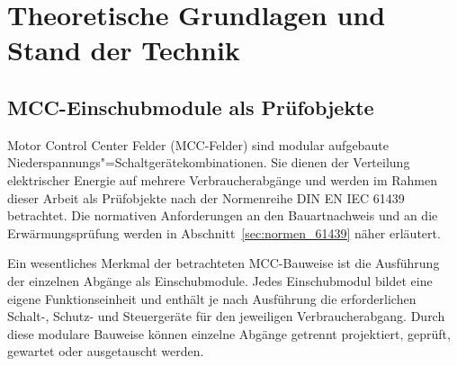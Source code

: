 \section{Theoretische Grundlagen und Stand der Technik}
\label{chap:theorieteil}



\subsection{MCC-Einschubmodule als Prüfobjekte}
\label{sec:mcc_einschubmodule}

Motor Control Center Felder (MCC-Felder) sind modular aufgebaute Niederspannungs"=Schaltgerätekombinationen. Sie dienen der Verteilung elektrischer Energie auf mehrere Verbraucherabgänge und werden im Rahmen dieser Arbeit als Prüfobjekte nach der Normenreihe DIN EN IEC 61439 betrachtet. Die normativen Anforderungen an den Bauartnachweis und an die Erwärmungsprüfung werden in Abschnitt~\ref{sec:normen_61439} näher erläutert.

Ein wesentliches Merkmal der betrachteten MCC-Bauweise ist die Ausführung der einzelnen Abgänge als Einschubmodule. Jedes Einschubmodul bildet eine eigene Funktionseinheit und enthält je nach Ausführung die erforderlichen Schalt-, Schutz- und Steuergeräte für den jeweiligen Verbraucherabgang. Durch diese modulare Bauweise können einzelne Abgänge getrennt projektiert, geprüft, gewartet oder ausgetauscht werden.

